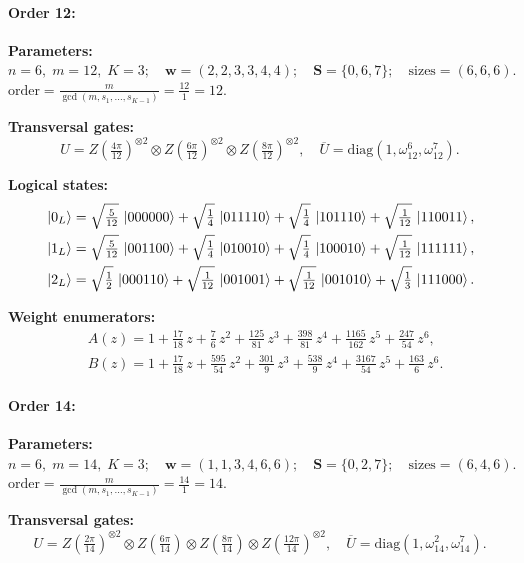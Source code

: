 \documentclass[pdflatex,sn-nature]{sn-jnl}%
\theoremstyle{thmstyleone}%
\theoremstyle{thmstyletwo}%
\theoremstyle{thmstylethree}%
\begin{document}
\begin{appendices}
\paragraph{\textbf{Order 12:}}
\noindent\textbf{Parameters:} $n=6,\; m=12,\; K=3;\quad \mathbf w=(2, 2, 3, 3, 4, 4);\quad \mathbf S=\{0, 6, 7\};\quad \text{sizes}=\left(6, 6, 6\right).$ $\displaystyle \text{order}=\frac{m}{\gcd(m,s_1,\dots,s_{K-1})}=\frac{12}{1}=12.$

\noindent\textbf{Transversal gates:}
\[
    U=Z \left(\tfrac{4\pi}{12}\right)^{\otimes2} \otimes Z \left(\tfrac{6\pi}{12}\right)^{\otimes2} \otimes Z \left(\tfrac{8\pi}{12}\right)^{\otimes2},\quad
    \overline U=\mathrm{diag}(1,\omega_{12}^{6},\omega_{12}^{7}).
\]

\noindent\textbf{Logical states:}
\begin{align*}
  &\ket{0_L} = \sqrt{\tfrac{5}{12}}\,\ket{000000} + \sqrt{\tfrac{1}{4}}\,\ket{011110} + \sqrt{\tfrac{1}{4}}\,\ket{101110} + \sqrt{\tfrac{1}{12}}\,\ket{110011}, \\
  &\ket{1_L} = \sqrt{\tfrac{5}{12}}\,\ket{001100} + \sqrt{\tfrac{1}{4}}\,\ket{010010} + \sqrt{\tfrac{1}{4}}\,\ket{100010} + \sqrt{\tfrac{1}{12}}\,\ket{111111}, \\
  &\ket{2_L} = \sqrt{\tfrac{1}{2}}\,\ket{000110} + \sqrt{\tfrac{1}{12}}\,\ket{001001} + \sqrt{\tfrac{1}{12}}\,\ket{001010} + \sqrt{\tfrac{1}{3}}\,\ket{111000}. 
\end{align*}

\noindent\textbf{Weight enumerators:}
\begin{align*}
    &A(z) = 1 + \tfrac{17}{18}\,z + \tfrac{7}{6}\,z^{2} + \tfrac{125}{81}\,z^{3} + \tfrac{398}{81}\,z^{4} + \tfrac{1165}{162}\,z^{5} + \tfrac{247}{54}\,z^{6}, \\
    &B(z) = 1 + \tfrac{17}{18}\,z + \tfrac{595}{54}\,z^{2} + \tfrac{301}{9}\,z^{3} + \tfrac{538}{9}\,z^{4} + \tfrac{3167}{54}\,z^{5} + \tfrac{163}{6}\,z^{6}.
\end{align*}

\paragraph{\textbf{Order 14:}}
\noindent\textbf{Parameters:} $n=6,\; m=14,\; K=3;\quad \mathbf w=(1, 1, 3, 4, 6, 6);\quad \mathbf S=\{0, 2, 7\};\quad \text{sizes}=\left(6, 4, 6\right).$ $\displaystyle \text{order}=\frac{m}{\gcd(m,s_1,\dots,s_{K-1})}=\frac{14}{1}=14.$

\noindent\textbf{Transversal gates:}
\[
    U=Z \left(\tfrac{2\pi}{14}\right)^{\otimes2} \otimes Z \left(\tfrac{6\pi}{14}\right) \otimes Z \left(\tfrac{8\pi}{14}\right) \otimes Z \left(\tfrac{12\pi}{14}\right)^{\otimes2},\quad
    \overline U=\mathrm{diag}(1,\omega_{14}^{2},\omega_{14}^{7}).
\]


\end{appendices}
\end{document}
